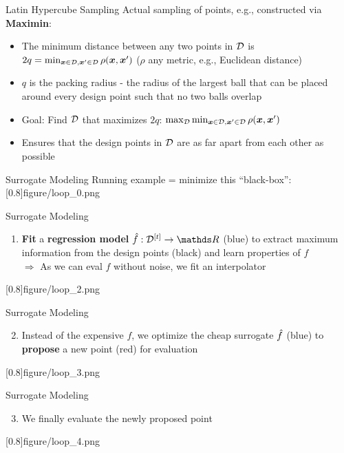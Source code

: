 \documentclass[11pt,compress,t,notes=noshow, xcolor=table]{beamer}
\begin{document}
\begin{framev}{Latin Hypercube Sampling}
Actual sampling of points, e.g., constructed via \textbf{Maximin}:
\begin{itemize}
\item The minimum distance between any two points in $\mathcal{D}$ is $2q = \min_{\bm{x} \in \mathcal{D}, \bm{x}' \in \mathcal{D}} \rho(\bm{x}, \bm{x}')$ ($\rho$ any metric, e.g., Euclidean distance)
\item $q$ is the packing radius - the radius of the largest ball that can be placed around every design point such that no two balls overlap
\item Goal: Find $\mathcal{D}$ that maximizes $2q$: $\max_{\mathcal{D}} \min_{\bm{x} \in \mathcal{D}, \bm{x}' \in \mathcal{D}} \rho(\bm{x}, \bm{x}')$
\item Ensures that the design points in $\mathcal{D}$ are as far apart from each other as possible
\end{itemize}
\end{framev}


\begin{framev}[align=top]{Surrogate Modeling}
Running example = minimize this \enquote{black-box}:
\imageFixed{2.5cm}{3cm}[0.8]{figure/loop_0.png}
\end{framev}


\begin{framev}[align=top]{Surrogate Modeling}
\begin{enumerate}
\item \textbf{Fit} a \textbf{regression model} $\fh: \Dt \rightarrow \R$ (blue) to extract maximum information from the design points (black) and learn properties of $f$\\
$\Rightarrow$ As we can eval $f$ without noise, we fit an interpolator
\end{enumerate}
\imageFixed{2.5cm}{3cm}[0.8]{figure/loop_2.png}
\end{framev}


\begin{framev}[align=top]{Surrogate Modeling}
\begin{enumerate}
\setcounter{enumi}{1}
\item Instead of the expensive $f$, we optimize the cheap surrogate $\hat{f}$ (blue) to \textbf{propose} a new point (red) for evaluation 
\end{enumerate}
\imageFixed{2.5cm}{3cm}[0.8]{figure/loop_3.png}
\end{framev}


\begin{framev}[align=top]{Surrogate Modeling}
\begin{enumerate}
\setcounter{enumi}{2}
\item We finally evaluate the newly proposed point
\end{enumerate}
\imageFixed{2.5cm}{3cm}[0.8]{figure/loop_4.png}
\end{framev}
\end{document}
